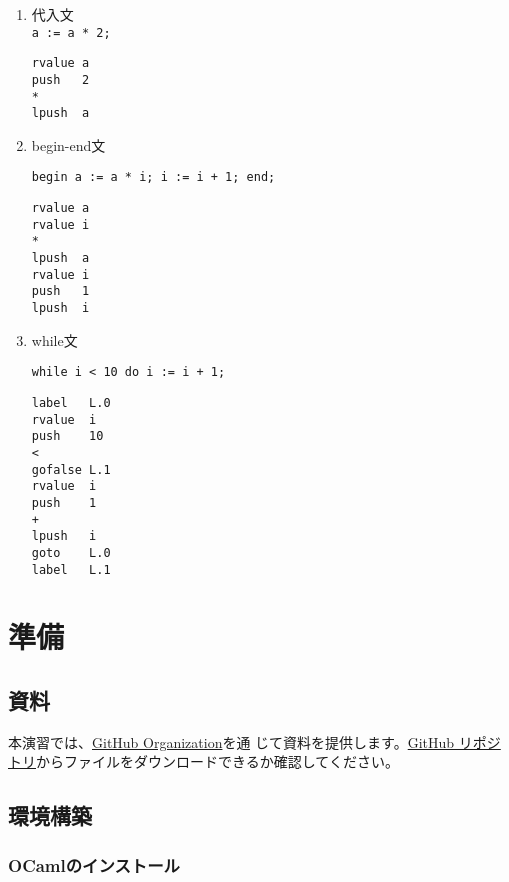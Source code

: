 \documentclass[a4paper,11pt]{jsarticle}
\begin{document}
\begin{enumerate}
\item 代入文 \\
   \texttt{a := a * 2;} \\
  \begin{lstlisting}
rvalue a
push   2
*
lpush  a
  \end{lstlisting}

\item begin-end文

   \texttt{begin a := a * i; i := i + 1; end;}

  \begin{lstlisting}
rvalue a
rvalue i
*
lpush  a
rvalue i
push   1
lpush  i
  \end{lstlisting}

\item while文

   \texttt{while i < 10 do i := i + 1;}


\begin{lstlisting}
label	L.0
rvalue	i
push	10
<
gofalse	L.1
rvalue	i
push	1
+
lpush	i
goto	L.0
label	L.1
  \end{lstlisting}

\end{enumerate}

\newpage
\section{準備}

\subsection{資料}

本演習では、\href{https://github.com/tmu-compiler-info-sys-exp-I}{GitHub Organization}を通
じて資料を提供します。\href{https://github.com/tmu-compiler-info-sys-exp-I/resume}{GitHub
  リポジトリ}からファイルをダウンロードできるか確認してください。

\subsection{環境構築}

\subsubsection{OCamlのインストール}
\end{document}
